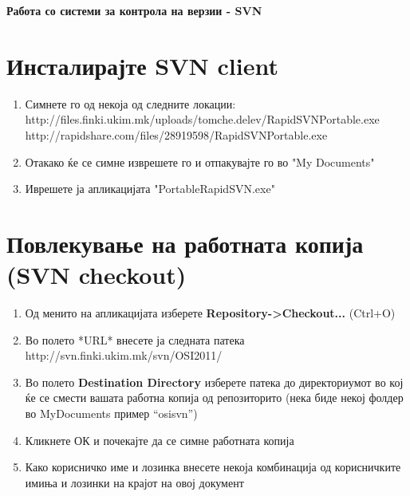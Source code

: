 \documentclass[12pt,a4paper]{exam}
\begin{document}
\pagestyle{headandfoot}
\headrule
{}
\begin{center}
\Large{\textbf{Работа со системи за контрола на верзии - SVN}}
\end{center}

\section{Инсталирајте SVN client}

\begin{enumerate}
  \item Симнете го од некоја од следните локации:\\
  http://files.finki.ukim.mk/uploads/tomche.delev/RapidSVNPortable.exe\\ 
  http://rapidshare.com/files/28919598/RapidSVNPortable.exe
  \item Отакако ќе се симне изврешете го и отпакувајте го во "My Documents"
  \item Иврешете ја апликацијата "PortableRapidSVN.exe"
\end{enumerate}
 
\section{Повлекување на работната копија (SVN checkout)}
\begin{enumerate}
  \item Од менито на апликацијата изберете \textbf{Repository->Checkout...} (Ctrl+O)
  \item Во полето *URL* внесете ја следната патека\\
  \linebreak
  http://svn.finki.ukim.mk/svn/OSI2011/
  \linebreak
  \item Во полето \textbf{Destination Directory} изберете патека до директориумот во
  кој ќе се смести вашата работна копија од репозиторито (нека биде некој
  фолдер во MyDocuments пример ``osisvn'')
  \item Кликнете ОК и почекајте да се симне работната копија 
  \item Како корисничко име и лозинка внесете некоја комбинација од корисничките
  имиња и лозинки на крајот на овој документ
 \end{enumerate}
\end{document}
